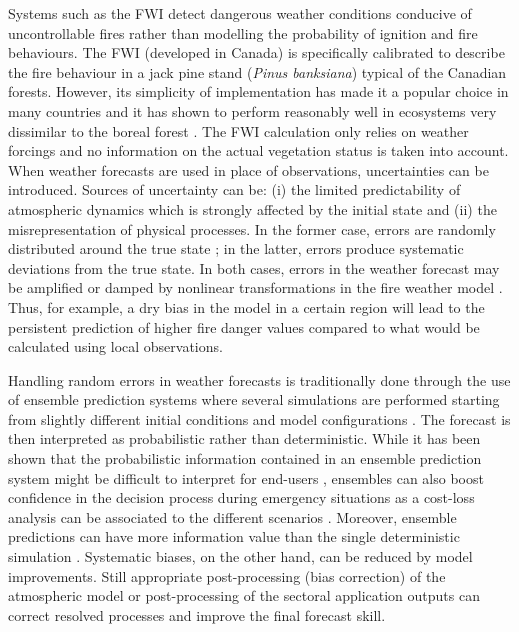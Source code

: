 \documentclass[, manuscript]{copernicus}
\begin{document}
Systems such as the FWI detect dangerous weather conditions conducive of
uncontrollable fires rather than modelling the probability of ignition
and fire behaviours. The FWI (developed in Canada) is specifically
calibrated to describe the fire behaviour in a jack pine stand
(\emph{Pinus banksiana}) typical of the Canadian forests. However, its
simplicity of implementation has made it a popular choice in many
countries and it has shown to perform reasonably well in ecosystems very
dissimilar to the boreal forest \citep{digiuseppe:16,degroot:07}. The
FWI calculation only relies on weather forcings and no information on
the actual vegetation status is taken into account. When weather
forecasts are used in place of observations, uncertainties can be
introduced. Sources of uncertainty can be: (i) the limited
predictability of atmospheric dynamics which is strongly affected by the
initial state and (ii) the misrepresentation of physical processes. In
the former case, errors are randomly distributed around the true state
\citep{orrell:01}; in the latter, errors produce systematic deviations
from the true state. In both cases, errors in the weather forecast may
be amplified or damped by nonlinear transformations in the fire weather
model \citep{erickson:18}. Thus, for example, a dry bias in the model in
a certain region will lead to the persistent prediction of higher fire
danger values compared to what would be calculated using local
observations.

Handling random errors in weather forecasts is traditionally done
through the use of ensemble prediction systems where several simulations
are performed starting from slightly different initial conditions and
model configurations \citep{molteni:96,buizza:99}. The forecast is then
interpreted as probabilistic rather than deterministic. While it has
been shown that the probabilistic information contained in an ensemble
prediction system might be difficult to interpret for end-users
\citep{pappenberger:13}, ensembles can also boost confidence in the
decision process during emergency situations as a cost-loss analysis can
be associated to the different scenarios \citep{cloke:17}. Moreover,
ensemble predictions can have more information value than the single
deterministic simulation \citep{richardson:00,zhu:02}. Systematic
biases, on the other hand, can be reduced by model improvements. Still
appropriate post-processing (bias correction) of the atmospheric model
\citep{piani:10,digiuseppe:13a,digiuseppe:13b} or post-processing of the
sectoral application outputs \citep{raftery:05} can correct resolved
processes and improve the final forecast skill.
\end{document}

